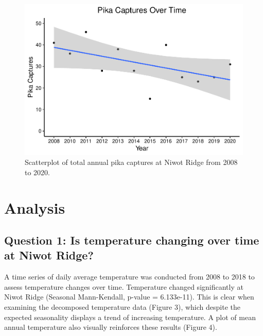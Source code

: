 \documentclass[
  12pt,
]{article}
\begin{document}
\begin{figure}
\centering
\includegraphics{FreedmanDye_ENV872_Project_files/figure-latex/unnamed-chunk-3-1.pdf}
\caption{Scatterplot of total annual pika captures at Niwot Ridge from
2008 to 2020.}
\end{figure}

\newpage

\hypertarget{analysis}{%
\section{Analysis}\label{analysis}}

\hypertarget{question-1-is-temperature-changing-over-time-at-niwot-ridge}{%
\subsection{Question 1: Is temperature changing over time at Niwot
Ridge?}\label{question-1-is-temperature-changing-over-time-at-niwot-ridge}}

A time series of daily average temperature was conducted from 2008 to
2018 to assess temperature changes over time. Temperature changed
significantly at Niwot Ridge (Seasonal Mann-Kendall, p-value =
6.133e-11). This is clear when examining the decomposed temperature data
(Figure 3), which despite the expected seasonality displays a trend of
increasing temperature. A plot of mean annual temperature also visually
reinforces these results (Figure 4).
\end{document}
